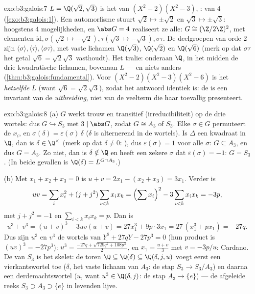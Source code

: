 \begin{solution}{exo:b3:galois:7}
$L = \Q(\sqrt2, \sqrt3)$ is het  van $(X^2 -
2)(X^2 - 3)$, :  van  $4$
(\cref{exo:b3:galois:1}). Een automorfisme stuurt $\sqrt2 \mapsto
\pm\sqrt2$ en $\sqrt3 \mapsto \pm\sqrt3$: hoogstens $4$
mogelijkheden, en $\abs G = 4$ realiseert ze alle: $G \cong
(\Z/2\Z)^2$, met elementen $\mathrm{id}, \sigma (\sqrt2 \mapsto
-\sqrt2), \tau (\sqrt3\mapsto-\sqrt3), \sigma\tau$. De deelgroepen
van orde $2$ zijn $\langle\sigma\rangle, \langle\tau\rangle,
\langle\sigma\tau\rangle$, met vaste lichamen $\Q(\sqrt3)$,
$\Q(\sqrt2)$ en $\Q(\sqrt6)$ (merk op dat $\sigma\tau$ het getal
$\sqrt6 = \sqrt2\sqrt3$ vasthoudt). Het tralie: onderaan $\Q$, in
het midden de drie kwadratische lichamen, bovenaan $L$ --- en
niets anders (\cref{thm:b3:galois:fundamental}). Voor
$(X^2-2)(X^2-3)(X^2-6)$ is het  \emph{hetzelfde}
$L$ (want $\sqrt6 = \sqrt2\sqrt3$), zodat het antwoord identiek
is: de  is een invariant van de
\emph{uitbreiding}, niet van de veelterm die haar toevallig
presenteert.
\end{solution}

\begin{solution}{exo:b3:galois:8}
(a) $G$ werkt trouw en transitief (irreducibiliteit) op de drie
wortels: dus $G \hookrightarrow S_3$ met $3 \mid \abs G$, zodat $G
\cong A_3$ of $S_3$. Elke $\sigma \in G$ permuteert de $x_i$, en
$\sigma(\delta) = \varepsilon(\sigma)\,\delta$ ($\delta$ is
alternerend in de wortels). Is $\Delta$ een kwadraat in $\Q$, dan
is $\delta \in \Q^\times$ (merk op dat $\delta \neq 0$:
), dus $\varepsilon(\sigma) = 1$ voor alle $\sigma$:
$G \subseteq A_3$, en dus $G = A_3$. Zo niet, dan is $\delta
\notin \Q$ en heeft een zekere $\sigma$ dat
$\varepsilon(\sigma) = -1$: $G = S_3$. (In beide gevallen is
$\Q(\delta) = L^{G \cap A_3}$.)

(b) Met $x_1 + x_2 + x_3 = 0$ is $u + v = 2x_1 - (x_2 + x_3) =
3x_1$. Verder is
\[
uv = \sum_i x_i^2 + (j + j^2)\sum_{i<k}x_ix_k
= \Bigl(\sum x_i\Bigr)^2 - 3\sum_{i<k}x_ix_k = -3p,
\]
met $j + j^2 = -1$ en $\sum_{i<k}x_ix_k = p$. Dan is
\[
u^3 + v^3 = (u+v)^3 - 3uv(u+v) = 27x_1^3 + 9p\cdot 3x_1
= 27\,(x_1^3 + px_1) = -27q .
\]
Dus zijn $u^3$ en $v^3$ de wortels van $Y^2 + 27qY - 27p^3 = 0$
(hun product is $(uv)^3 = -27p^3$): $u^3 = \frac{-27q +
\sqrt{729q^2 + 108p^3}}2$, en $x_1 = \frac{u + v}3$ met $v =
-3p/u$: Cardano. De  van $S_3$ is het skelet: de
toren $\Q \subseteq \Q(\delta) \subseteq \Q(\delta, j, u)$ voegt
eerst een vierkantswortel toe ($\delta$, het vaste lichaam van
$A_3$: de stap $S_3 \to S_3/A_3$) en daarna een derdemachtswortel
($u$, want $u^3 \in \Q(\delta, j)$: de stap $A_3 \to \{e\}$) ---
de afgeleide reeks $S_3 \supset A_3 \supset \{e\}$ in levenden
lijve.
\end{solution}

